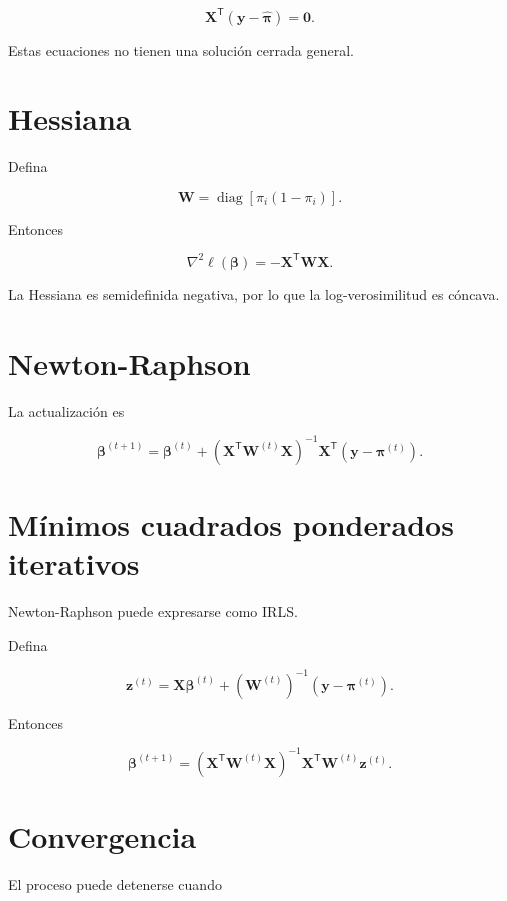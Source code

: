 \documentclass[
  spanish,
  11pt,
  letterpaper,
  DIV=11,
  numbers=noendperiod]{scrreprt}
\theoremstyle{definition}
\theoremstyle{plain}
\theoremstyle{definition}
\theoremstyle{remark}
\begin{document}
\[
\mathbf{X}^{\mathsf T}
(\mathbf{y}-\widehat{\boldsymbol{\pi}})
=
\mathbf{0}.
\]

Estas ecuaciones no tienen una solución cerrada general.

\section{Hessiana}\label{hessiana}

Defina

\[
\mathbf{W}
=
\operatorname{diag}
\left[
\pi_i(1-\pi_i)
\right].
\]

Entonces

\[
\nabla^2\ell(\boldsymbol{\beta})
=
-\mathbf{X}^{\mathsf T}\mathbf{W}\mathbf{X}.
\]

La Hessiana es semidefinida negativa, por lo que la log-verosimilitud es
cóncava.

\section{Newton-Raphson}\label{newton-raphson}

La actualización es

\[
\boldsymbol{\beta}^{(t+1)}
=
\boldsymbol{\beta}^{(t)}
+
\left(
\mathbf{X}^{\mathsf T}
\mathbf{W}^{(t)}
\mathbf{X}
\right)^{-1}
\mathbf{X}^{\mathsf T}
\left(
\mathbf{y}
-
\boldsymbol{\pi}^{(t)}
\right).
\]

\section{Mínimos cuadrados ponderados
iterativos}\label{muxednimos-cuadrados-ponderados-iterativos}

Newton-Raphson puede expresarse como IRLS.

Defina

\[
\mathbf{z}^{(t)}
=
\mathbf{X}\boldsymbol{\beta}^{(t)}
+
\left(
\mathbf{W}^{(t)}
\right)^{-1}
\left(
\mathbf{y}
-
\boldsymbol{\pi}^{(t)}
\right).
\]

Entonces

\[
\boldsymbol{\beta}^{(t+1)}
=
\left(
\mathbf{X}^{\mathsf T}
\mathbf{W}^{(t)}
\mathbf{X}
\right)^{-1}
\mathbf{X}^{\mathsf T}
\mathbf{W}^{(t)}
\mathbf{z}^{(t)}.
\]

\section{Convergencia}\label{convergencia}

El proceso puede detenerse cuando
\end{document}

